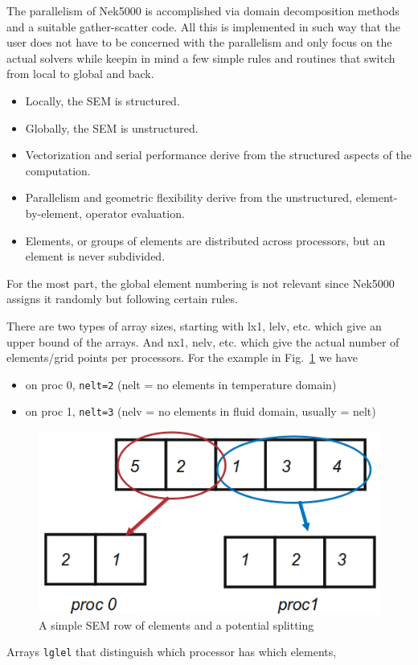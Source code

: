 


The parallelism of Nek5000 is accomplished via domain decomposition methods and a suitable gather-scatter code. All this is implemented in such way that the user does not have to be concerned with the parallelism and only focus on the actual solvers while keepin in mind a few simple rules and routines that switch from local to global and back.
\begin{itemize}
\item Locally, the SEM is structured.

\item Globally, the SEM is unstructured.

\item Vectorization and serial performance derive from the structured aspects of the computation.

\item Parallelism and geometric flexibility derive from the unstructured, element-by-element, operator evaluation.

\item Elements, or groups of elements are distributed across processors, but an element is never subdivided.
\end{itemize}

For the most part, the global element numbering is not relevant since Nek5000 assigns it randomly but following certain rules. 

There are two types of array sizes, starting with {\color{red}l}x1, {\color{red}l}elv, etc. which give an upper bound of the arrays. And {\color{red}n}x1, {\color{red}n}elv, etc. which give the actual number of elements/grid points per processors. For the example in Fig.~\ref{fig:procsplit} we have 
\begin{itemize}
\item on proc 0, {\tt nelt=2}  (nelt = no elements in temperature domain)
\item on proc 1, {\tt nelt=3}  (nelv = no elements in fluid domain, usually = nelt)
\end{itemize}

\begin{figure}
\centering
\includegraphics[scale=0.5]{Figs/serial_parallel}
\caption{A simple SEM row of elements and a potential splitting}
\label{fig:procsplit}
\end{figure}
Arrays {\tt lglel} that distinguish which processor has which elements, 

